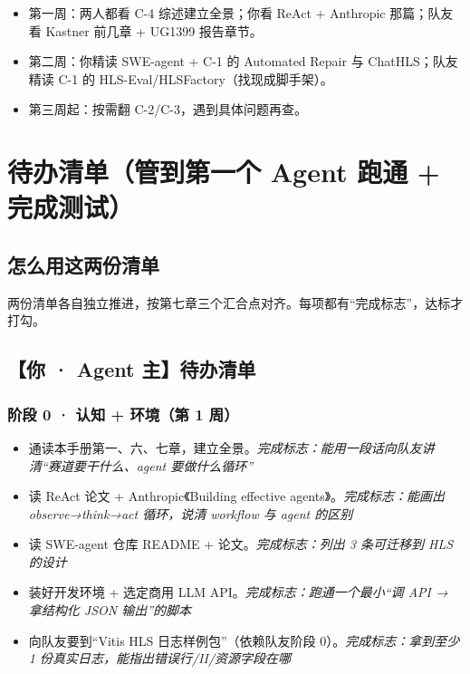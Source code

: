 \documentclass[12pt,a4paper]{ctexbook}
\begin{document}
\begin{itemize}
\item 第一周：两人都看 C-4 综述建立全景；你看 ReAct + Anthropic 那篇；队友看 Kastner 前几章 + UG1399 报告章节。
\item 第二周：你精读 SWE-agent + C-1 的 Automated Repair 与 ChatHLS；队友精读 C-1 的 HLS-Eval/HLSFactory（找现成脚手架）。
\item 第三周起：按需翻 C-2/C-3，遇到具体问题再查。
\end{itemize}

\chapter{待办清单（管到第一个 Agent 跑通 + 完成测试）}

\section{怎么用这两份清单}

两份清单各自独立推进，按第七章三个汇合点对齐。每项都有“完成标志”，达标才打勾。

\section{【你 · Agent 主】待办清单}

\subsection*{阶段 0 · 认知 + 环境（第 1 周）}

\begin{itemize}
\item[☐] 通读本手册第一、六、七章，建立全景。\hfill {\small\textit{完成标志：能用一段话向队友讲清“赛道要干什么、agent 要做什么循环”}}
\item[☐] 读 ReAct 论文 + Anthropic《Building effective agents》。\hfill {\small\textit{完成标志：能画出 observe→think→act 循环，说清 workflow 与 agent 的区别}}
\item[☐] 读 SWE-agent 仓库 README + 论文。\hfill {\small\textit{完成标志：列出 3 条可迁移到 HLS 的设计}}
\item[☐] 装好开发环境 + 选定商用 LLM API。\hfill {\small\textit{完成标志：跑通一个最小“调 API → 拿结构化 JSON 输出”的脚本}}
\item[☐] 向队友要到“Vitis HLS 日志样例包”（依赖队友阶段 0）。\hfill {\small\textit{完成标志：拿到至少 1 份真实日志，能指出错误行/II/资源字段在哪}}
\end{itemize}
\end{document}
